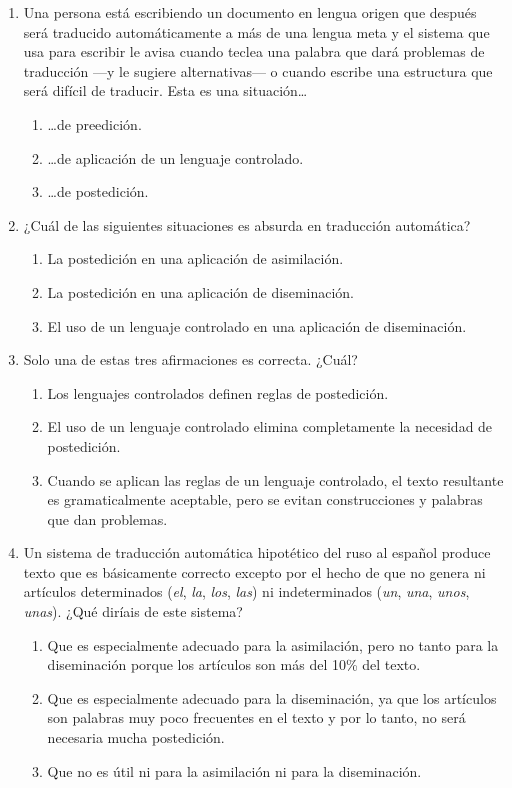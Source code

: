 \begin{enumerate}
\item Una persona está escribiendo un documento en lengua origen que después será traducido automáticamente a más de una lengua meta y el sistema que usa para escribir le avisa cuando teclea una palabra que dará problemas de traducción ---y le sugiere alternativas--- o cuando escribe una estructura que será difícil de traducir. Esta es una situación\ldots \begin{enumerate} \item \ldots de preedición. \item \ldots de aplicación de un lenguaje controlado. \item \ldots de postedición. \end{enumerate} 

\item ¿Cuál de las siguientes situaciones es absurda en traducción automática? \begin{enumerate} \item La postedición en una aplicación de asimilación. \item La postedición en una aplicación de diseminación. \item El uso de un lenguaje controlado en una aplicación de diseminación. \end{enumerate} 

\item Solo una de estas tres afirmaciones es correcta. ¿Cuál? \begin{enumerate} \item Los lenguajes controlados definen reglas de postedición. \item El uso de un lenguaje controlado elimina completamente la necesidad de postedición. \item Cuando se aplican las reglas de un lenguaje controlado, el texto resultante es gramaticalmente aceptable, pero se evitan construcciones y palabras que dan problemas. \end{enumerate} 

\item Un sistema de traducción automática hipotético del ruso al español produce texto que es básicamente correcto excepto por el hecho de que no genera ni artículos determinados (\emph{el}, \emph{la}, \emph{los}, \emph{las}) ni indeterminados (\emph{un}, \emph{una}, \emph{unos}, \emph{unas}). ¿Qué diríais de este sistema? \begin{enumerate} \item Que es especialmente adecuado para la asimilación, pero no tanto para la diseminación porque los artículos son más del 10\% del texto. \item Que es especialmente adecuado para la diseminación, ya que los artículos son palabras muy poco frecuentes en el texto y por lo tanto, no será necesaria mucha postedición. \item Que no es útil ni para la asimilación ni para la diseminación. \end{enumerate} 


\end{enumerate}
